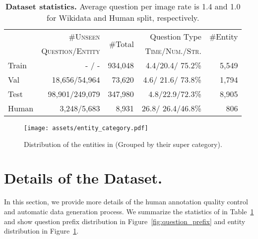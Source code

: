 \documentclass[11pt]{article}
\begin{document}
\begin{table}
\centering
\tiny
\begin{tabular}{lrrrr}
\toprule
  &  \#\textsc{Unseen} & \multirow{2}{*}{\#Total} &  Question Type & \#Entity\\
    &  \textsc{Question/Entity} & & \textsc{Time/Num./Str.} &\\
    \midrule
    Train & - / - & 934,048 & 4.4/20.4/ 75.2\% & 5,549\\
    Val & 18,656/54,964	& 73,620	&4.6/	21.6/	73.8\%&		1,794\\
    Test & 98,901/249,079	& 347,980	&4.8/22.9/72.3\%	&	8,905\\
    Human & 3,248/5,683&	8,931&	26.8/	26.4/46.8\%&		806\\
\bottomrule
\end{tabular}
\caption{\textbf{\ourdataset Dataset statistics.} Average question per image rate is 1.4 and 1.0 for Wikidata and Human split, respectively.}
\label{tab:opera_stat}
\end{table} 
\begin{figure}[ht!]
    \centering
    \texttt{[image: assets/entity\_category.pdf]}
    \caption{Distribution of the entities in \ourdataset (Grouped by their super category).}
    \label{fig:entity_distribution}
\end{figure}






\section{Details of the Dataset.}
In this section, we provide more details of the human annotation quality control and automatic data generation process. 
We summarize the statistics of \ourdataset in Table~\ref{tab:opera_stat} and show question prefix distribution in Figure~\ref{fig:question_prefix} and entity distribution in Figure~\ref{fig:entity_distribution}.
\end{document}
